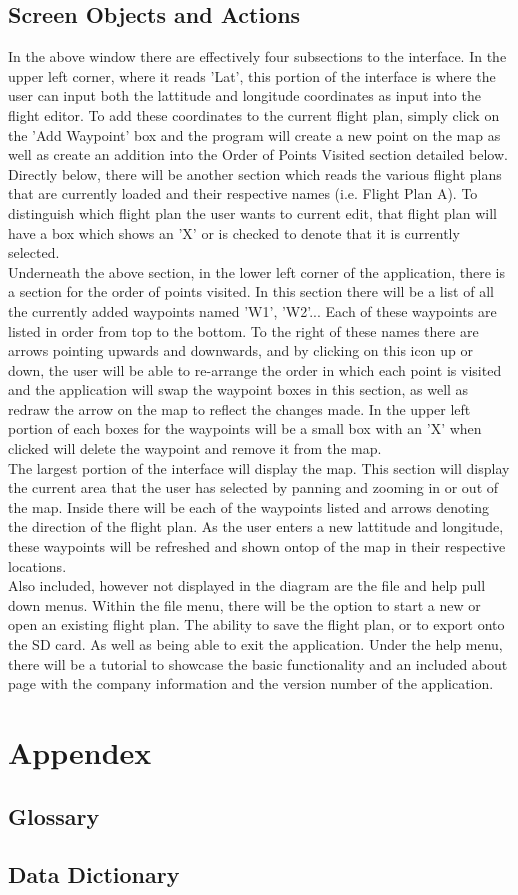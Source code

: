 \documentclass[12pt, letterpaper]{article}
\begin{document}
	\subsection{Screen Objects and Actions}
In the above window there are effectively four subsections to the interface. In the upper left corner, where it reads 'Lat', this portion of the interface is where the user can input both the lattitude and longitude coordinates as input into the flight editor. To add these coordinates to the current flight plan, simply click on the 'Add Waypoint' box and the program will create a new point on the map as well as create an addition into the Order of Points Visited section detailed below. \\
Directly below, there will be another section which reads the various flight plans that are currently loaded and their respective names (i.e. Flight Plan A). To distinguish which flight plan the user wants to current edit, that flight plan will have a box which shows an 'X' or is checked to denote that it is currently selected. \\
Underneath the above section, in the lower left corner of the application, there is a section for the order of points visited. In this section there will be a list of all the currently added waypoints named 'W1', 'W2'... Each of these waypoints are listed in order from top to the bottom. To the right of these names there are arrows pointing upwards and downwards, and by clicking on this icon up or down, the user will be able to re-arrange the order in which each point is visited and the application will swap the waypoint boxes in this section, as well as redraw the arrow on the map to reflect the changes made. In the upper left portion of each boxes for the waypoints will be a small box with an 'X' when clicked will delete the waypoint and remove it from the map.\\
The largest portion of the interface will display the map. This section will display the current area that the user has selected by panning and zooming in or out of the map. Inside there will be each of the waypoints listed and arrows denoting the direction of the flight plan. As the user enters a new lattitude and longitude, these waypoints will be refreshed and shown ontop of the map in their respective locations. \\
Also included, however not displayed in the diagram are the file and help pull down menus. Within the file menu, there will be the option to start a new or open an existing flight plan. The ability to save the flight plan, or to export onto the SD card. As well as being able to exit the application. Under the help menu, there will be a tutorial to showcase the basic functionality and an included about page with the company information and the version number of the application. 

\section{Appendex}
  \subsection{Glossary}
  \subsection{Data Dictionary}

{}

\end{document}
